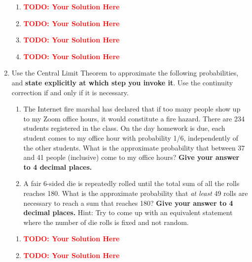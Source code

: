 \documentclass[12pt]{article}
\def\todo#1{\textcolor{red}{\textbf{#1}}}
\renewcommand{\|}{\mid}
\begin{document}
\begin{enumerate}
\begin{tcolorbox}
\begin{enumerate}
\item \todo{TODO: Your Solution Here}
\item \todo{TODO: Your Solution Here}
\item \todo{TODO: Your Solution Here}
\item \todo{TODO: Your Solution Here}
\end{enumerate}
\end{tcolorbox}
    
\item Use the Central Limit Theorem to approximate the following probabilities, and \textbf{state explicitly at which step you invoke it}. Use the continuity correction if and only if it is necessary.
\begin{enumerate}
    \item The Internet fire marshal has declared that if too many people show up to my Zoom office hours, it would constitute a fire hazard. There are 234 students registered in the class.  On the day homework is due, each student comes to my office hour with probability 1/6, independently of the other students.  What is the approximate probability that between 37 and 41 people (inclusive) come to my office hours? \textbf{Give your answer to 4 decimal places.}
    \item A fair 6-sided die is repeatedly rolled until the total sum of all the rolls reaches 180. What is the approximate probability that \textit{at least} 49 rolls are necessary to reach a sum that reaches 180?  \textbf{Give your answer to 4 decimal places.} Hint: Try to come up with an equivalent statement where the number of die rolls is fixed and not random.
\end{enumerate}

\begin{tcolorbox}
\begin{enumerate}
\item \todo{TODO: Your Solution Here}
\item \todo{TODO: Your Solution Here}
\end{enumerate}
\end{tcolorbox}


\end{enumerate}
\end{document}
